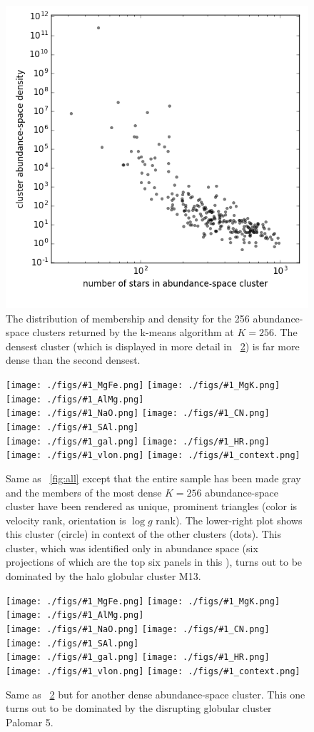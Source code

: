 \documentclass[12pt, letterpaper, preprint]{aastex}
\newcommand{\logg}{\log g}
\newlength{\figwidth}\setlength{\figwidth}{0.3\textwidth}
\newcommand{\insanefigure}[1]{%
\texttt{[image: ./figs/\#1\_MgFe.png]}%
\texttt{[image: ./figs/\#1\_MgK.png]}%
\texttt{[image: ./figs/\#1\_AlMg.png]}\\
\texttt{[image: ./figs/\#1\_NaO.png]}%
\texttt{[image: ./figs/\#1\_CN.png]}%
\texttt{[image: ./figs/\#1\_SAl.png]}\\
\texttt{[image: ./figs/\#1\_gal.png]}%
\texttt{[image: ./figs/\#1\_HR.png]}\\
\texttt{[image: ./figs/\#1\_vlon.png]}%
\texttt{[image: ./figs/\#1\_context.png]}}
\begin{document}
\begin{figure}[!bp]
\includegraphics[width=1.5\figwidth]{./figs/clusters_0256.png}
\caption{The distribution of membership and density for the 256
  abundance-space clusters returned by the k-means algorithm at
  $K=256$.  The densest cluster (which is displayed in more detail in 
  \figurename~\ref{fig:M13}) is far more dense than the second
  densest.\label{fig:densities}}
\end{figure}
\begin{figure}[!p]
\insanefigure{cluster_0256_0253}
\caption{Same as \figurename~\ref{fig:all} except that the entire
  sample has been made gray and the members of the most dense
  $K=256$ abundance-space cluster have been rendered as unique, prominent triangles
  (color is velocity rank, orientation is $\logg$ rank).
  The lower-right plot shows this cluster (circle) in context of the other clusters (dots).
  This cluster, which was identified only in abundance space (six
  projections of which are the top six panels in this \figurename),
  turns out to be dominated by the halo globular cluster
  M13.\label{fig:M13}}
\end{figure}
\begin{figure}[!p]
\insanefigure{cluster_0256_0034}
\caption{Same as \figurename~\ref{fig:M13} but for another dense
  abundance-space cluster.
  This one turns out to be dominated by the disrupting globular
  cluster Palomar 5.\label{fig:Pal5}}
\end{figure}
\end{document}
